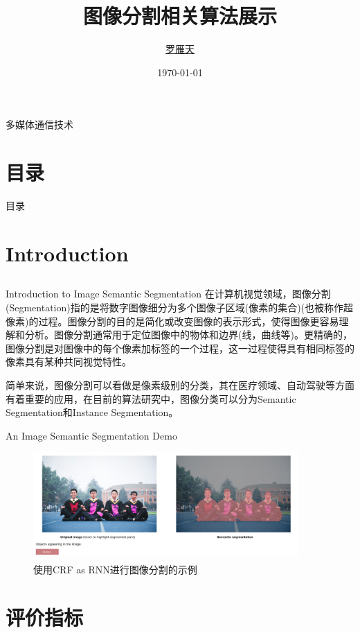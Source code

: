 \documentclass{beamer}
\title{图像分割相关算法展示}
\author{\href{mailto:luoyt14thu@gmail.com}{罗雁天}}
\date{\today}
\newcommand{\upcite}[1]{\textsuperscript{\textsuperscript{\cite{#1}}}}
\begin{document}
\begin{frame}{多媒体通信技术}
\titlepage
\end{frame}

\section*{目录}
\begin{frame}{目录}
\tableofcontents
\end{frame}

\section{Introduction}
\subsection*{}
\begin{frame}{Introduction to Image Semantic Segmentation}
\qquad 在计算机视觉领域，图像分割(Segmentation)指的是将数字图像细分为多个图像子区域(像素的集合)(也被称作超像素)的过程。图像分割的目的是简化或改变图像的表示形式，使得图像更容易理解和分析。图像分割通常用于定位图像中的物体和边界(线，曲线等)。更精确的，图像分割是对图像中的每个像素加标签的一个过程，这一过程使得具有相同标签的像素具有某种共同视觉特性。

\qquad 简单来说，图像分割可以看做是像素级别的分类，其在医疗领域、自动驾驶等方面有着重要的应用，在目前的算法研究中，图像分类可以分为Semantic Segmentation和Instance Segmentation。
\end{frame}
\begin{frame}{An Image Semantic Segmentation Demo}
\begin{figure}[h]
	\centering
	\includegraphics[width=0.9\textwidth]{images/segdemo.png}
	\caption{\label{demo}使用CRF as RNN\upcite{zheng2015conditional}进行图像分割的示例}
\end{figure}
\end{frame}
\section{评价指标}
\end{document}
